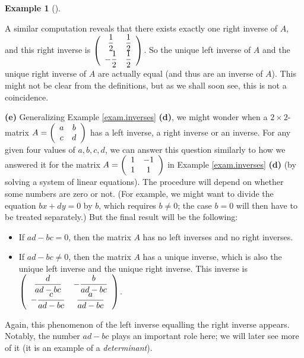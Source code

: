 \documentclass[numbers=enddot,12pt,final,onecolumn,notitlepage]{scrartcl}%
\theoremstyle{definition}
\newtheorem{exam}[theo]{Example}
\newenvironment{example}[1][]
{\begin{exam}[#1]\begin{leftbar}}
{\end{leftbar}\end{exam}}
\begin{document}
\begin{example}
A similar computation reveals that there exists exactly one right inverse of
$A$, and this right inverse is $\left(
\begin{array}
[c]{cc}%
\dfrac{1}{2} & \dfrac{1}{2}\\
-\dfrac{1}{2} & \dfrac{1}{2}%
\end{array}
\right)  $. So the unique left inverse of $A$ and the unique right inverse of
$A$ are actually equal (and thus are an inverse of $A$). This might not be
clear from the definitions, but as we shall soon see, this is not a coincidence.

\textbf{(e)} Generalizing Example \ref{exam.inverses} \textbf{(d)}, we might
wonder when a $2\times2$-matrix $A=\left(
\begin{array}
[c]{cc}%
a & b\\
c & d
\end{array}
\right)  $ has a left inverse, a right inverse or an inverse. For any given
four values of $a,b,c,d$, we can answer this question similarly to how we
answered it for the matrix $A=\left(
\begin{array}
[c]{cc}%
1 & -1\\
1 & 1
\end{array}
\right)  $ in Example \ref{exam.inverses} \textbf{(d)} (by solving a system of
linear equations). The procedure will depend on whether some numbers are zero
or not. (For example, we might want to divide the equation $bx+dy=0$ by $b$,
which requires $b\neq0$; the case $b=0$ will then have to be treated
separately.) But the final result will be the following:

\begin{itemize}
\item If $ad-bc=0$, then the matrix $A$ has no left inverses and no right inverses.

\item If $ad-bc\neq0$, then the matrix $A$ has a unique inverse, which is also
the unique left inverse and the unique right inverse. This inverse is $\left(
%
\begin{array}
[c]{cc}%
\dfrac{d}{ad-bc} & -\dfrac{b}{ad-bc}\\
-\dfrac{c}{ad-bc} & \dfrac{a}{ad-bc}%
\end{array}
\right)  $.
\end{itemize}

Again, this phenomenon of the left inverse equalling the right inverse
appears. Notably, the number $ad-bc$ plays an important role here; we will
later see more of it (it is an example of a \textit{determinant}).
\end{example}
\end{document}
